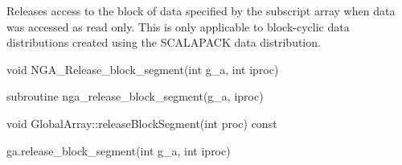 \documentclass[12pt]{article}
\begin{document}
\local

\begin{desc}

Releases access to the block of data specified by the subscript array when data
was accessed as read only. This is only applicable to block-cyclic data
distributions created using the SCALAPACK data distribution.

\end{desc}



\begin{capi}
\begin{ccode}
void NGA_Release_block_segment(int g_a, int iproc)
\end{ccode}
\begin{funcargs}
\end{funcargs}
\end{capi}

\begin{fapi}
\begin{fcode}
subroutine nga_release_block_segment(g_a, iproc)
\end{fcode}
\begin{funcargs}
\end{funcargs}
\end{fapi}

\begin{cxxapi}
\begin{cxxcode}
void GlobalArray::releaseBlockSegment(int proc) const
\end{cxxcode}
\begin{funcargs}
\end{funcargs}
\end{cxxapi}

\begin{pyapi}
\begin{pycode}
ga.release_block_segment(int g_a, int iproc)
\end{pycode}
\begin{funcargs}
\end{funcargs}
\end{pyapi}

\local
\end{document}
